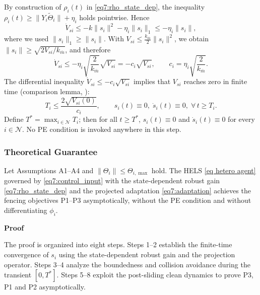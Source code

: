 By construction of $\rho_i(t)$ in \eqref{eq7:rho_state_dep}, the inequality
$\rho_i(t) \ge \|Y_i\tilde{\Theta}_i\| + \eta_i$ holds pointwise.  Hence
\begin{equation}
	\dot{V}_{si} \le -k\|s_i\|^2 - \eta_i\|s_i\|_1
	\le -\eta_i\|s_i\|,
	\label{eq7:Vs_dot_bound}
\end{equation}
where we used $\|s_i\|_1 \ge \|s_i\|$.  With $V_{si} \le \tfrac{k_{\overline m}}{2}\|s_i\|^2$,
we obtain $\|s_i\| \ge \sqrt{2V_{si}/k_{\overline m}}$, and therefore
\begin{equation}
	\dot{V}_{si} \le -\eta_i \sqrt{\frac{2}{k_{\overline m}}} \sqrt{V_{si}}
	= -c_i \sqrt{V_{si}}, \qquad
	c_i = \eta_i \sqrt{\frac{2}{k_{\overline m}}}.
	\label{eq7:finite_time_ode}
\end{equation}
The differential inequality $\dot{V}_{si} \le -c_i \sqrt{V_{si}}$ implies that $V_{si}$ reaches
zero in finite time (comparison lemma, \cite[Lemma~3.6]{khalilNonlinearSystems2002}):
\begin{equation}
	T_i \le \frac{2\sqrt{V_{si}(0)}}{c_i},
	\qquad
	s_i(t) \equiv 0,\; \dot{s}_i(t) \equiv 0,\; \forall\, t \ge T_i.
	\label{eq7:finite_time}
\end{equation}
Define $T^* = \max_{i\in\mathcal{N}} T_i$; then for all $t \ge T^*$, $s_i(t) \equiv 0$ and
$\dot{s}_i(t) \equiv 0$ for every $i \in \mathcal{N}$.  No PE condition is invoked anywhere
in this step.

\subsubsection{Theoretical Guarantee}

\begin{theorem}
	Let Assumptions A1--A4 and $\|\Theta_i\| \le \Theta_{i,\max}$ hold.  The HELS
	\eqref{eq hetero agent} governed by \eqref{eq7:control_input} with the
	state-dependent robust gain \eqref{eq7:rho_state_dep} and the projected adaptation
	\eqref{eq7:adaptation} achieves the fencing objectives P1--P3 asymptotically,
	without the PE condition and without differentiating $\phi_i$.
\end{theorem}

\noindent\textbf{Proof}

The proof is organized into eight steps.  Steps 1--2 establish the finite-time convergence
of $s_i$ using the state-dependent robust gain and the projection operator.  Steps 3--4
analyze the boundedness and collision avoidance during the transient $[0,T^*]$.  Steps 5--8
exploit the post-sliding clean dynamics to prove P3, P1 and P2 asymptotically.

